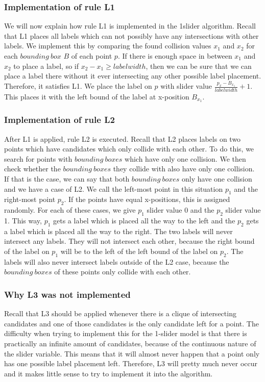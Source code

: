 \documentclass[crop=false,a4paper,oneside,11pt]{article}
\begin{document}
\subsubsection{Implementation of rule L1}
We will now explain how rule L1 is implemented in the 1slider algorithm. Recall that L1 places all labels which can not possibly have any intersections with other labels. We implement this by comparing the found collision values $x_1$ and $x_2$ for each $bounding \ box$ $B$ of each point $p$. If there is enough space in between $x_1$ and $x_2$ to place a label, so if $x_2 - x_1 \geq labelwidth$, then we can be sure that we can place a label there without it ever intersecting any other possible label placement. Therefore, it satisfies L1. We place the label on $p$ with slider value $\frac{p_x - B_{x_1}}{labelwidth} + 1$. This places it with the left bound of the label at x-position $B_{x_1}$.

\subsubsection{Implementation of rule L2}
After L1 is applied, rule L2 is executed. Recall that L2 places labels on two points which have candidates which only collide with each other. To do this, we search for points with $bounding \ boxes$ which have only one collision. We then check whether the $bounding \ boxes$ they collide with also have only one collision. If that is the case, we can say that both $bounding \ boxes$ only have one collision and we have a case of L2. We call the left-most point in this situation $p_1$ and the right-most point $p_2$. If the points have equal x-positions, this is assigned randomly. For each of these cases, we give $p_1$ slider value 0 and the $p_2$ slider value 1. This way, $p_1$ gets a label which is placed all the way to the left and the $p_2$ gets a label which is placed all the way to the right. The two labels will never intersect any labels. They will not intersect each other, because the right bound of the label on $p_1$ will be to the left of the left bound of the label on $p_2$. The labels will also never intersect labels outside of the L2 case, because the $bounding \ boxes$ of these points only collide with each other.

\subsubsection{Why L3 was not implemented}
Recall that L3 should be applied whenever there is a clique of intersecting candidates and one of those candidates is the only candidate left for a point. The difficulty when trying to implement this for the 1-slider model is that there is practically an infinite amount of candidates, because of the continuous nature of the slider variable. This means that it will almost never happen that a point only has one possible label placement left. Therefore, L3 will pretty much never occur and it makes little sense to try to implement it into the algorithm.
\end{document}
